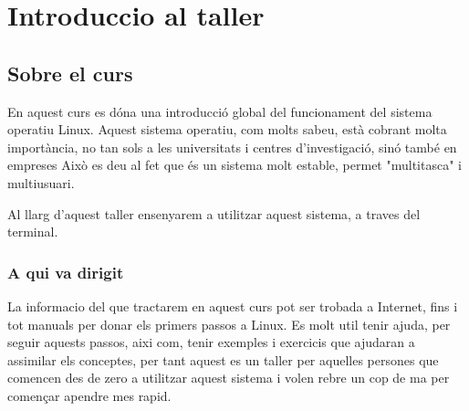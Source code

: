\section{Introduccio al taller}

\subsection{Sobre el curs}

\par
En aquest curs es dóna una introducció global del funcionament del sistema operatiu Linux.
Aquest sistema operatiu, com molts sabeu, està cobrant molta importància, no tan sols a les universitats i centres d'investigació, sinó també en empreses
Això es deu al fet que és un sistema molt estable, permet "multitasca" i multiusuari.
\par
Al llarg d'aquest taller ensenyarem a utilitzar aquest sistema, a traves del terminal.

\subsubsection{A qui va dirigit}

\par
La informacio del que tractarem en aquest curs pot ser trobada a Internet, fins i tot manuals per donar els primers passos a Linux.
Es molt util tenir ajuda, per seguir aquests passos, aixi com, tenir exemples i exercicis que ajudaran a assimilar els conceptes, per tant aquest es un taller per aquelles persones que comencen des de zero a utilitzar aquest sistema i volen rebre un cop de ma per començar apendre mes rapid.